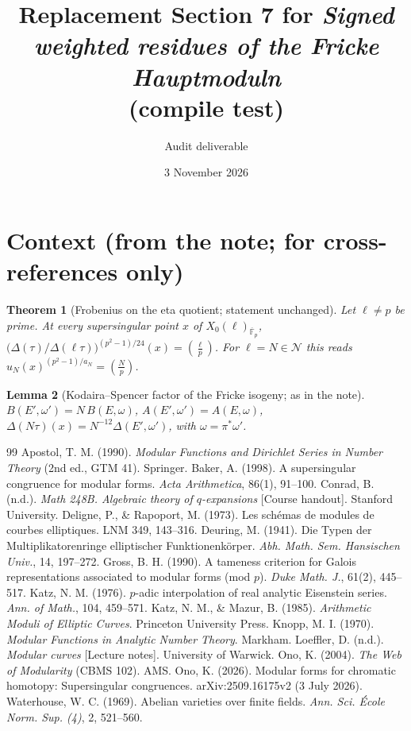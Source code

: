 \documentclass[11pt,a4paper]{article}
\title{Replacement Section 7 for \emph{Signed weighted residues of the Fricke Hauptmoduln}\\(compile test)}
\author{Audit deliverable}
\date{3 November 2026}
\numberwithin{equation}{section}
\newtheorem{theorem}{Theorem}[section]
\newtheorem{lemma}[theorem]{Lemma}
\theoremstyle{definition}
\theoremstyle{remark}
\newcommand{\Fb}{\overline{\mathbb F}_p}
\newcommand{\leg}[2]{\left(\frac{#1}{#2}\right)}
\newcommand{\Lp}[1]{\left(\frac{#1}{p}\right)}
\begin{document}
\maketitle
\setcounter{section}{6}
\section*{Context (from the note; for cross-references only)}
\setcounter{section}{0}
\begin{theorem}[Frobenius on the eta quotient; statement unchanged]\label{thm:C}
Let $\ell\ne p$ be prime. At every supersingular point $x$ of $X_0(\ell)_{\Fb}$,
$\bigl(\Delta(\tau)/\Delta(\ell\tau)\bigr)^{(p^2-1)/24}(x)=\leg{\ell}{p}$.
For $\ell=N\in\mathcal N$ this reads $u_N(x)^{(p^2-1)/a_N}=\Lp N$.
\end{theorem}
\begin{lemma}[Kodaira--Spencer factor of the Fricke isogeny; as in the note]\label{lem:Bisog}
$B(E',\omega')=N\,B(E,\omega)$, $A(E',\omega')=A(E,\omega)$, $\Delta(N\tau)(x)=N^{-12}\Delta(E',\omega')$, with $\omega=\pi^*\omega'$.
\end{lemma}
\setcounter{section}{6}

\begin{thebibliography}{99}\small
{} Apostol, T. M. (1990). \emph{Modular Functions and Dirichlet Series in Number Theory} (2nd ed., GTM 41). Springer.
 Baker, A. (1998). A supersingular congruence for modular forms. \emph{Acta Arithmetica}, 86(1), 91--100.
 Conrad, B. (n.d.). \emph{Math 248B. Algebraic theory of $q$-expansions} [Course handout]. Stanford University.
 Deligne, P., \& Rapoport, M. (1973). Les sch\'emas de modules de courbes elliptiques. LNM 349, 143--316.
 Deuring, M. (1941). Die Typen der Multiplikatorenringe elliptischer Funktionenk\"orper. \emph{Abh. Math. Sem. Hansischen Univ.}, 14, 197--272.
 Gross, B. H. (1990). A tameness criterion for Galois representations associated to modular forms (mod $p$). \emph{Duke Math. J.}, 61(2), 445--517.
 Katz, N. M. (1976). $p$-adic interpolation of real analytic Eisenstein series. \emph{Ann. of Math.}, 104, 459--571.
 Katz, N. M., \& Mazur, B. (1985). \emph{Arithmetic Moduli of Elliptic Curves}. Princeton University Press.
 Knopp, M. I. (1970). \emph{Modular Functions in Analytic Number Theory}. Markham.
 Loeffler, D. (n.d.). \emph{Modular curves} [Lecture notes]. University of Warwick.
 Ono, K. (2004). \emph{The Web of Modularity} (CBMS 102). AMS.
 Ono, K. (2026). Modular forms for chromatic homotopy: Supersingular congruences. arXiv:2509.16175v2 (3 July 2026).
 Waterhouse, W. C. (1969). Abelian varieties over finite fields. \emph{Ann. Sci. \'Ecole Norm. Sup. (4)}, 2, 521--560.
\end{thebibliography}
\end{document}
